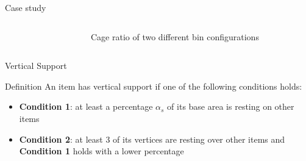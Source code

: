 \documentclass{beamer}
\begin{document}
\begin{frame}{Case study}
\begin{columns}[onlytextwidth,T]
\begin{figure}
                \end{figure}
                \begin{figure}
                    \resizebox{\columnwidth}{!}{%
                        
                    }
                    \caption*{Cage ratio of two different bin configurations}
                    \label{fig:cage_ratio}
                \end{figure}
        \end{columns}
    \end{frame}

    \begin{frame}{Vertical Support}
        \begin{block}{Definition}
            An item has vertical support if one of the following conditions holds:
            \begin{itemize}
                \item \textbf{Condition 1}: at least a percentage $\alpha_s$ of its base area is resting on other items
                \item \textbf{Condition 2}: at least 3 of its vertices are resting over other items and \textbf{Condition 1} holds with a lower percentage
            \end{itemize}
        \end{block}
        \begin{figure}[H]
            \resizebox{!}{30mm}{%
                
            }
            \label{fig:support}
        \end{figure}
    \end{frame}
\end{document}
